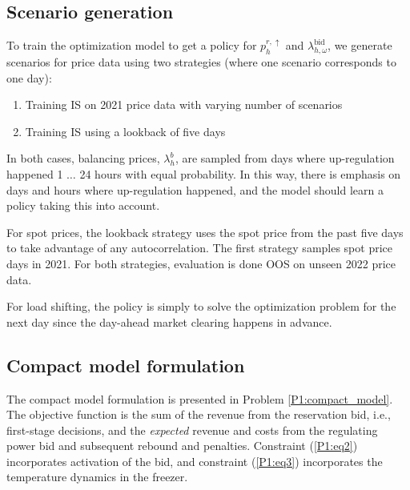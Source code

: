 \subsection{Scenario generation}\label{sec:scenario_generation}

To train the optimization model to get a policy for $p_{h}^{r,\uparrow}$ and $\lambda_{h,\omega}^{\text{bid}}$, we generate scenarios for price data using two strategies (where one scenario corresponds to one day):

\begin{enumerate}
    \item Training IS on 2021 price data with varying number of scenarios
    \item Training IS using a lookback of five days
\end{enumerate}

In both cases, balancing prices, $\lambda_{h}^{b}$, are sampled from days where up-regulation happened 1 $\ldots$ 24 hours  with equal probability. In this way, there is emphasis on days and hours where up-regulation happened, and the model should learn a policy taking this into account.

For spot prices, the lookback strategy uses the spot price from the past five days to take advantage of any autocorrelation. The first strategy samples spot price days in 2021. For both strategies, evaluation is done OOS on unseen 2022 price data.

For load shifting, the policy is simply to solve the optimization problem for the next day since the day-ahead market clearing happens in advance.

\subsection{Compact model formulation}

The compact model formulation is presented in Problem \ref{P1:compact_model}. The objective function is the sum of the revenue from the reservation bid, i.e., first-stage decisions, and the \textit{expected} revenue and costs from the regulating power bid and subsequent rebound and penalties. Constraint (\ref{P1:eq2}) incorporates activation of the bid, and constraint (\ref{P1:eq3}) incorporates the temperature dynamics in the freezer.


